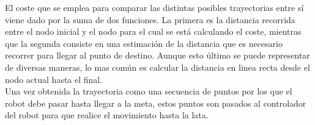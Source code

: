 El coste que se emplea para comparar las distintas posibles trayectorias entre sí viene dado por la suma de dos funciones. La primera es la distancia recorrida entre el nodo inicial y el nodo para el cual se está calculando el coste, mientras que la segunda consiste en una estimación de la distancia que es necesario recorrer para llegar al punto de destino. Aunque esto último se puede representar de diversas maneras, lo mas común es calcular la distancia en linea recta desde el nodo actual hasta el final.\\

Una vez obtenida la trayectoria como una secuencia de puntos por los que el robot debe pasar hasta llegar a la meta, estos puntos son pasados al controlador del robot para que realice el movimiento hasta la lata.\\